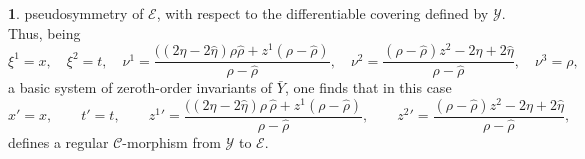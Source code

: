 \documentclass[12pt,english]{elsarticle}
\theoremstyle{plain}
\theoremstyle{plain}
\theoremstyle{remark}
\theoremstyle{plain}
\theoremstyle{definition}
\theoremstyle{definition}
\newtheorem{example}[thm]{\protect\examplename}
\providecommand{\examplename}{Example}
\begin{document}
\begin{example}
pseudosymmetry of $\mathcal{E}$, with respect to the differentiable covering
defined by $\mathcal{Y}$. Thus, being
%
\begin{equation*}
\xi ^{1}=x,\quad \xi ^{2}=t,\quad \nu ^{1}=
\frac{((2\eta -2\hat{\eta})\rho \hat{\rho}+z^{1}\left (\rho -\hat{\rho}\right )}{\rho -\hat{\rho}},
\quad \nu ^{2}=
\frac{(\rho -\hat{\rho})z^{2}-2\eta +2\hat{\eta}}{\rho -\hat{\rho}},
\quad \nu ^{3}=\rho ,
\end{equation*}
%
a basic system of zeroth-order invariants of $\bar{Y}$, one finds that
in this case
%
\begin{equation}
x'=x,\qquad t'=t,\qquad z^{1}{}'=
\frac{((2\eta -2\hat{\eta})\rho \,\hat{\rho}+z^{1}\left (\rho -\hat{\rho}\right )}{\rho -\hat{\rho}},
\qquad z^{2}{}'=
\frac{\left (\rho -\hat{\rho}\right )z^{2}-2\eta +2\hat{\eta}}{\rho -\hat{\rho}},
\label{eq:ABT-CH-1-1}
\end{equation}
%
defines a regular $\mathcal{C}$-morphism from $\mathcal{Y}$ to
$\mathcal{E }$.
\end{example}
\end{document}

